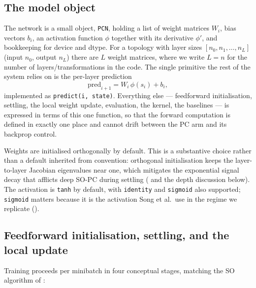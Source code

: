 \subsection{The model object}

The network is a small object, \texttt{PCN}, holding a list of weight matrices $W_i$, bias vectors
$b_i$, an activation function $\phi$ together with its derivative $\phi'$, and bookkeeping for device
and dtype. For a topology with layer sizes $[n_0, n_1, \dots, n_L]$ (input $n_0$, output $n_L$) there
are $L$ weight matrices, where we write $L = n$ for the number of layers/transformations in the code.
The single primitive the rest of the system relies on is the per-layer prediction
\[
  \mathrm{pred}_{i+1} = W_i\,\phi(s_i) + b_i,
\]
implemented as \texttt{predict(i, state)}. Everything else --- feedforward initialisation, settling,
the local weight update, evaluation, the kernel, the baselines --- is expressed in terms of this one
function, so that the forward computation is defined in exactly one place and cannot drift between
the PC arm and its backprop control.

Weights are initialised orthogonally by default. This is a substantive choice rather than a default
inherited from convention: orthogonal initialisation keeps the layer-to-layer Jacobian eigenvalues
near one, which mitigates the exponential signal decay that afflicts deep SO-PC during settling
( and the depth discussion below). The activation is \texttt{tanh} by default, with
\texttt{identity} and \texttt{sigmoid} also supported; \texttt{sigmoid} matters because it is the
activation Song et al.\ use in the regime we replicate ().

\subsection{Feedforward initialisation, settling, and the local update}

Training proceeds per minibatch in four conceptual stages, matching the SO algorithm
of :

